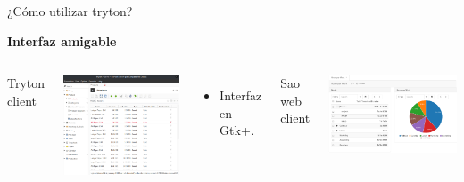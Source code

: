     \begin{frame}[fragile=singleslide]{¿Cómo utilizar tryton?}
        \vspace*{-1cm}
        \begin{flushright}
            {\color{TurkishRose}\textbf{Interfaz amigable}}
        \end{flushright}
        \vspace*{-0.5cm}
        \begin{columns}
            \begin{center}
                {\color{ChetwodeBlue}Tryton client}
            \end{center}
            \vspace*{-0.1cm}
            \includegraphics[width=\textwidth]{./Images/demo-products.png}
            \fontsize{10}{8}\selectfont
            \begin{itemize}
                \item Interfaz en Gtk+.
            \end{itemize}
            \begin{center}
                {\color{ChetwodeBlue}Sao web client}
            \end{center}
            \includegraphics[width=\textwidth]{./Images/tryton-sao.png}

\end{columns}
\end{frame}
